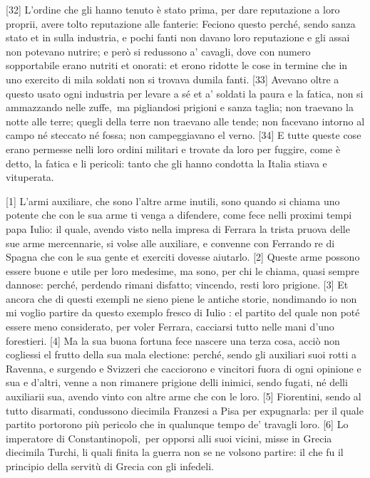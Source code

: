 {[}32{]} L'ordine che gli hanno tenuto è stato prima, per dare
reputazione a loro proprii, avere tolto reputazione alle fanterie:
Feciono questo perché, sendo sanza stato et in sulla industria, e pochi
fanti non davano loro reputazione e gli assai non potevano nutrire; e
però si redussono a' cavagli, dove con numero sopportabile erano nutriti
et onorati: et erono ridotte le cose in termine che in uno exercito di
 mila soldati non si trovava dumila fanti. {[}33{]} Avevano oltre a
questo usato ogni industria per levare a sé et a' soldati la paura e la
fatica, non si ammazzando nelle zuffe,\est\ ma pigliandosi prigioni e sanza
taglia; non traevano la notte alle terre; quegli della terre non
traevano alle tende; non facevano intorno al campo né steccato né fossa;
non campeggiavano el verno. {[}34{]} E tutte queste cose erano permesse
nelli loro ordini militari e trovate da loro per fuggire, come è detto,
la fatica e li pericoli: tanto che gli hanno condotta la Italia stiava e
vituperata.


{[}1{]} L'armi auxiliare, che sono l'altre arme inutili, sono quando si
chiama uno potente che con le sua arme ti venga a difendere, come fece
nelli proximi tempi papa Iulio: il quale, avendo visto nella impresa di
Ferrara la trista pruova delle sue arme mercennarie, si volse alle
auxiliare, e convenne con Ferrando re di Spagna che con le sua gente et
exerciti dovesse aiutarlo. {[}2{]} Queste arme possono essere buone e
utile per loro medesime, ma sono, per chi le chiama, quasi sempre
dannose: perché, perdendo rimani disfatto; vincendo, resti loro
prigione. {[}3{]} Et ancora che di questi exempli ne sieno piene le
antiche storie, nondimando io non mi voglio partire da questo exemplo
fresco di Iulio : el partito del quale non poté essere meno
considerato, per voler Ferrara, cacciarsi tutto nelle mani d'uno
forestieri. {[}4{]} Ma la sua buona fortuna fece nascere una terza cosa,
acciò non cogliessi el frutto della sua mala electione: perché, sendo
gli auxiliari suoi rotti a Ravenna, e surgendo e Svizzeri che cacciorono
e vincitori fuora di ogni opinione e sua e d'altri, venne a non rimanere
prigione delli inimici, sendo fugati, né delli auxiliarii sua, avendo
vinto con altre arme che con le loro. {[}5{]} Fiorentini, sendo al tutto
disarmati, condussono diecimila Franzesi a Pisa per expugnarla: per il
quale partito portorono più pericolo che in qualunque tempo de' travagli
loro. {[}6{]} Lo imperatore di Constantinopoli,\est\ per opporsi alli suoi
vicini, misse in Grecia diecimila Turchi, li quali finita la guerra non
se ne volsono partire: il che fu il principio della servitù di Grecia
con gli infedeli.

